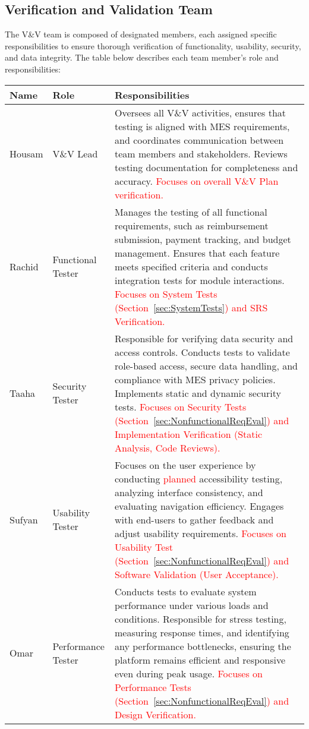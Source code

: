 \documentclass[12pt, titlepage]{article}
\begin{document}
\subsection{Verification and Validation Team}
The V\&V team is composed of designated members, each assigned specific responsibilities to ensure thorough verification of functionality, usability, security, and data integrity. The table below describes each team member's role and responsibilities:

\begin{tabularx}{\textwidth}{|X|X|X|}
    \hline
    \textbf{Name} & \textbf{Role} & \textbf{Responsibilities} \\
    \hline
    Housam & V\&V Lead & Oversees all V\&V activities, ensures that testing is aligned with MES requirements, and coordinates communication between team members and stakeholders. Reviews testing documentation for completeness and accuracy. \textcolor{red}{Focuses on overall V\&V Plan verification.} \\
    \hline
    Rachid & Functional Tester & Manages the testing of all functional requirements, such as reimbursement submission, payment tracking, and budget management. Ensures that each feature meets specified criteria and conducts integration tests for module interactions. \textcolor{red}{Focuses on System Tests (Section~\ref{sec:SystemTests}) and SRS Verification.} \\
    \hline
    Taaha & Security Tester & Responsible for verifying data security and access controls. Conducts tests to validate role-based access, secure data handling, and compliance with MES privacy policies. Implements static and dynamic security tests. \textcolor{red}{Focuses on Security Tests (Section~\ref{sec:NonfunctionalReqEval}) and Implementation Verification (Static Analysis, Code Reviews).} \\
    \hline
    Sufyan & Usability Tester & Focuses on the user experience by conducting \textcolor{red}{planned} accessibility testing, analyzing interface consistency, and evaluating navigation efficiency. Engages with end-users to gather feedback and adjust usability requirements. \textcolor{red}{Focuses on Usability Test (Section~\ref{sec:NonfunctionalReqEval}) and Software Validation (User Acceptance).} \\
    \hline
    Omar & Performance Tester & Conducts tests to evaluate system performance under various loads and conditions. Responsible for stress testing, measuring response times, and identifying any performance bottlenecks, ensuring the platform remains efficient and responsive even during peak usage. \textcolor{red}{Focuses on Performance Tests (Section~\ref{sec:NonfunctionalReqEval}) and Design Verification.} \\
    \hline
\end{tabularx}
\end{document}
